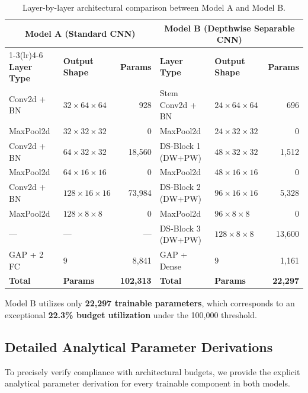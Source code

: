 \documentclass[11pt,a4paper]{article}
\begin{document}
\begin{table}[H]
  \centering
  \caption{Layer-by-layer architectural comparison between Model A and Model B.}
  \label{tab:layer_comparison}
  \small
  \begin{tabular}{llrllr}
    \toprule
    \multicolumn{3}{c}{\textbf{Model A (Standard CNN)}} & \multicolumn{3}{c}{\textbf{Model B (Depthwise Separable CNN)}} \\
    \cmidrule(lr){1-3}\cmidrule(lr){4-6}
    \textbf{Layer Type} & \textbf{Output Shape} & \textbf{Params} & \textbf{Layer Type} & \textbf{Output Shape} & \textbf{Params} \\
    \midrule
    Conv2d + BN & $32 \times 64 \times 64$ & 928 & Stem Conv2d + BN & $24 \times 64 \times 64$ & 696 \\
    MaxPool2d   & $32 \times 32 \times 32$ & 0   & MaxPool2d        & $24 \times 32 \times 32$ & 0 \\
    Conv2d + BN & $64 \times 32 \times 32$ & 18,560 & DS-Block 1 (DW+PW) & $48 \times 32 \times 32$ & 1,512 \\
    MaxPool2d   & $64 \times 16 \times 16$ & 0   & MaxPool2d        & $48 \times 16 \times 16$ & 0 \\
    Conv2d + BN & $128 \times 16 \times 16$ & 73,984 & DS-Block 2 (DW+PW) & $96 \times 16 \times 16$ & 5,328 \\
    MaxPool2d   & $128 \times 8 \times 8$ & 0   & MaxPool2d        & $96 \times 8 \times 8$   & 0 \\
    ---         & ---                     & --- & DS-Block 3 (DW+PW) & $128 \times 8 \times 8$  & 13,600 \\
    GAP + 2 FC    & $9$                   & 8,841 & GAP + Dense      & $9$                      & 1,161 \\
    \midrule
    \textbf{Total} & \textbf{Params} & \textbf{102,313} & \textbf{Total} & \textbf{Params} & \textbf{22,297} \\
    \bottomrule
  \end{tabular}
\end{table}

Model B utilizes only \textbf{22,297 trainable parameters}, which corresponds to an exceptional \textbf{22.3\% budget utilization} under the 100,000 threshold.


\subsection{Detailed Analytical Parameter Derivations}
To precisely verify compliance with architectural budgets, we provide the explicit analytical parameter derivation for every trainable component in both models.
\end{document}
